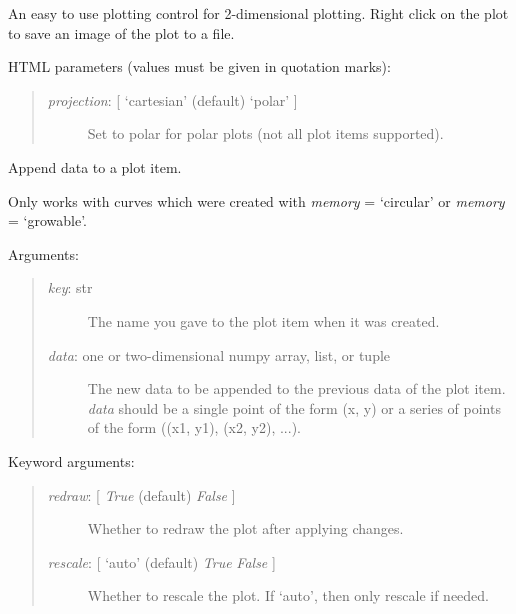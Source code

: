 \documentclass[letterpaper,10pt,english]{sphinxmanual}
\begin{document}
\begin{fulllineitems}
\label{api:mpl.Plot2D}
An easy to use plotting control for 2-dimensional plotting.
Right click on the plot to save an image of the plot to a file.

HTML parameters (values must be given in quotation marks):
\begin{quote}
\begin{description}
\item[{\emph{projection}: {[} `cartesian' (default) \textbar{} `polar' {]}}] \leavevmode
Set to polar for polar plots (not all plot items supported).

\end{description}
\end{quote}

\begin{fulllineitems}
\label{api:mpl.Plot2D.append_data}
Append data to a plot item.

Only works with curves which were created with 
\emph{memory} = `circular' or \emph{memory} = `growable'.

Arguments:
\begin{quote}
\begin{description}
\item[{\emph{key}: str}] \leavevmode
The name you gave to the plot item when it was created.

\item[{\emph{data}: one or two-dimensional numpy array, list, or tuple}] \leavevmode
The new data to be appended to the previous data of the plot item.
\emph{data} should be a single point of the form (x, y) or a series of
points of the form ((x1, y1), (x2, y2), ...).

\end{description}
\end{quote}

Keyword arguments:
\begin{quote}
\begin{description}
\item[{\emph{redraw}: {[} \emph{True}  (default) \textbar{} \emph{False} {]}}] \leavevmode
Whether to redraw the plot after applying changes.

\item[{\emph{rescale}: {[} `auto' (default) \textbar{} \emph{True} \textbar{} \emph{False} {]}}] \leavevmode
Whether to rescale the plot. If `auto', then only rescale if needed.


\end{description}
\end{quote}
\end{fulllineitems}
\end{fulllineitems}
\end{document}
